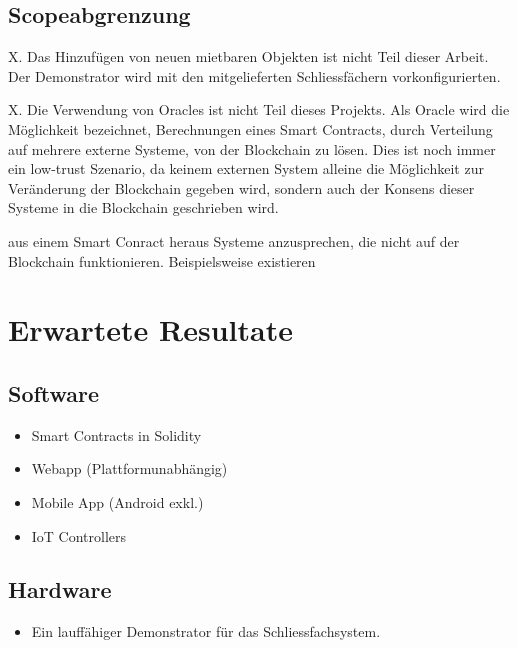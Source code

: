 \subsection{Scopeabgrenzung}
X. Das Hinzufügen von neuen mietbaren Objekten ist nicht Teil dieser Arbeit. Der Demonstrator wird mit den mitgelieferten Schliessfächern vorkonfigurierten.

X. Die Verwendung von Oracles ist nicht Teil dieses Projekts. Als Oracle wird die Möglichkeit bezeichnet, Berechnungen eines Smart Contracts, durch Verteilung auf mehrere externe Systeme, von der Blockchain zu lösen. Dies ist noch immer ein low-trust Szenario, da keinem externen System alleine die Möglichkeit zur Veränderung der Blockchain gegeben wird, sondern auch der Konsens dieser Systeme in die Blockchain geschrieben wird.\cite{blog.ethereum.org/oracles}

aus einem Smart Conract heraus Systeme anzusprechen, die nicht auf der Blockchain funktionieren. Beispielsweise existieren 

\section{Erwartete Resultate}
\label{sec:Erwartete_Resultate}

\subsection{Software}
\begin{itemize}
    \item Smart Contracts in Solidity
    \item Webapp (Plattformunabhängig)
    \item Mobile App (Android exkl.)
    \item IoT Controllers
\end{itemize}

\subsection{Hardware}
\begin{itemize}
    \item Ein lauffähiger Demonstrator für das Schliessfachsystem.
\end{itemize}
